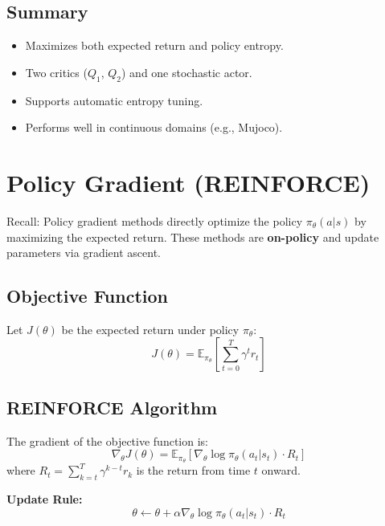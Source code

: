 \documentclass{article}
\begin{document}
\subsection{Summary}

\begin{itemize}
    \item Maximizes both expected return and policy entropy.
    \item Two critics ($Q_1$, $Q_2$) and one stochastic actor.
    \item Supports automatic entropy tuning.
    \item Performs well in continuous domains (e.g., Mujoco).
\end{itemize}

\section{Policy Gradient (REINFORCE)}

Recall: Policy gradient methods directly optimize the policy $\pi_\theta(a|s)$ by maximizing the expected return. These methods are \textbf{on-policy} and update parameters via gradient ascent.

\subsection{Objective Function}

Let $J(\theta)$ be the expected return under policy $\pi_\theta$:
\begin{equation}
    J(\theta) = \mathbb{E}_{\pi_\theta} \left[ \sum_{t=0}^{T} \gamma^t r_t \right]
\end{equation}

\subsection{REINFORCE Algorithm}

The gradient of the objective function is:
\begin{equation}
    \nabla_\theta J(\theta) = \mathbb{E}_{\pi_\theta} \left[ \nabla_\theta \log \pi_\theta(a_t | s_t) \cdot R_t \right]
\end{equation}
where $R_t = \sum_{k=t}^T \gamma^{k-t} r_k$ is the return from time $t$ onward.

\textbf{Update Rule:}
\begin{equation}
    \theta \leftarrow \theta + \alpha \nabla_\theta \log \pi_\theta(a_t | s_t) \cdot R_t
\end{equation}
\end{document}
